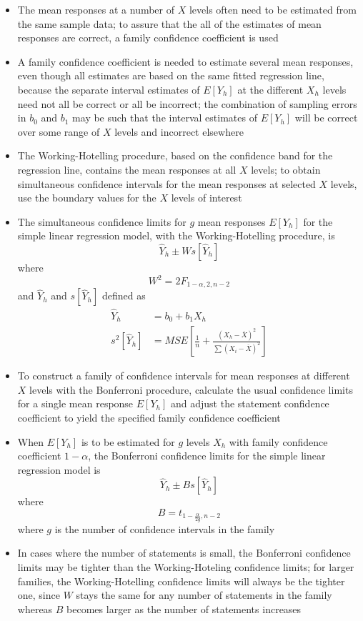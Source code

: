 \begin{itemize}
\item The mean responses at a number of $X$ levels often need to be estimated from the same sample data; to assure that the all of the estimates of mean responses are correct, a family confidence coefficient is used 
\item A family confidence coefficient is needed to estimate several mean responses, even though all estimates are based on the same fitted regression line, because  the separate interval estimates of $E[Y_h]$ at the different $X_h$ levels need not all be correct or all be incorrect; the combination of sampling errors in $b_0$ and $b_1$ may be such that the interval estimates of $E[Y_h]$ will be correct over some range of $X$ levels and incorrect elsewhere 
\item The Working-Hotelling procedure, based on the confidence band for the regression line, contains the mean responses at all $X$ levels; to obtain simultaneous confidence intervals for the mean responses at selected $X$ levels, use the boundary values for the $X$ levels of interest
\item The simultaneous confidence limits for $g$ mean responses $E[Y_h]$ for the simple linear regression model, with the Working-Hotelling procedure, is $$ \hat{Y}_h \pm Ws[\hat{Y}_h] $$ where $$ W^2 = 2F_{1-\alpha, 2, n-2} $$ and $\hat{Y}_h$ and $s[\hat{Y}_h]$ defined as $$ \begin{aligned} \hat{Y}_h &= b_0 + b_1 X_h \\ s^2[\hat{Y}_h] &= MSE\left[\frac{1}{n} + \frac{(X_h - \overline{X})^2}{\sum (X_i - \overline{X})^2}\right] \end{aligned} $$ 
\item To construct a family of confidence intervals for mean responses at different $X$ levels with the Bonferroni procedure, calculate the usual confidence limits for a single mean response $E[Y_h]$ and adjust the statement confidence coefficient to yield the specified family confidence coefficient 
\item When $E[Y_h]$ is to be estimated for $g$ levels $X_h$ with family confidence coefficient $1-\alpha$, the Bonferroni confidence limits for the simple linear regression model is $$ \hat{Y}_h \pm B s[\hat{Y}_h] $$ where $$ B = t_{1 - \frac{\alpha}{2g}, n-2} $$ where $g$ is the number of confidence intervals in the family
\item In cases where the number of statements is small, the Bonferroni confidence limits may be tighter than the Working-Hoteling confidence limits; for larger families, the Working-Hotelling confidence limits will always be the tighter one, since $W$ stays the same for any number of statements in the family whereas $B$ becomes larger as the number of statements increases

\end{itemize}
